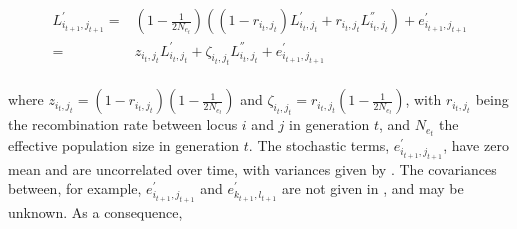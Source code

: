 \documentclass[12pt]{article}
\begin{document}
\begin{bibunit}
\begin{equation}
\begin{array}{rl}
L^{'}_{i_{t+1},j_{t+1}} =& \left(1-\frac{1}{2N_{e_t}}
\right)\left((1-r_{i_{t},j_{t}})L^{'}_{i_{t},j_{t}} + r_{i_{t},j_{t}}L^{''}_{i_{t},j_{t}}\right)+e^{'}_{i_{t+1},j_{t+1}}\\
=& z_{i_{t},j_{t}}L^{'}_{i_{t},j_{t}} + \zeta_{i_{t},j_{t}}L^{''}_{i_{t},j_{t}}+e^{'}_{i_{t+1},j_{t+1}}\\
\end{array}
\end{equation}

where $z_{i_{t},j_{t}}=(1-r_{i_{t},j_{t}})(1-\frac{1}{2N_{e_t}})$ and  $\zeta_{i_{t},j_{t}}=r_{i_{t},j_{t}}(1-\frac{1}{2N_{e_t}})$, with $r_{i_{t},j_{t}}$ being the recombination rate between locus $i$ and $j$ in generation $t$, and $N_{e_t}$ the effective population size in generation $t$. The stochastic terms, $e^{'}_{i_{t+1},j_{t+1}}$, have zero mean and are uncorrelated over time, with variances given by \citet[][Eq 25, although those variances must be divided by 4 here since we are working with the frequency of alleles in individuals rather than gametes]{Ohta.1969}. The covariances between, for example, $e^{'}_{i_{t+1},j_{t+1}}$ and $e^{'}_{k_{t+1},l_{t+1}}$ are not given in \citet{Ohta.1969}, and may be unknown. As a consequence,


\end{bibunit}
\end{document}
